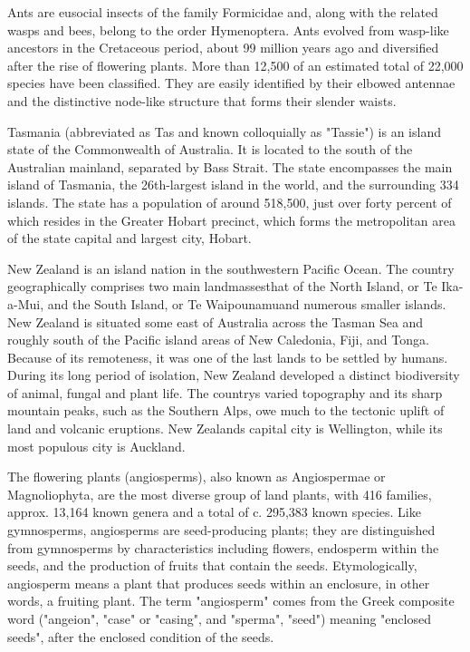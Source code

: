 \documentclass{article} \usepackage{iclr2019_conference,times}
\begin{document}
Ants are eusocial insects of the family Formicidae and, along with the related wasps and bees, belong to the order Hymenoptera. Ants evolved from wasp-like ancestors in the Cretaceous period, about 99 million years ago and diversified after the rise of flowering plants. More than 12,500 of an estimated total of 22,000 species have been classified. They are easily identified by their elbowed antennae and the distinctive node-like structure that forms their slender waists.

Tasmania (abbreviated as Tas and known colloquially as "Tassie") is an island state of the Commonwealth of Australia. It is located to the south of the Australian mainland, separated by Bass Strait. The state encompasses the main island of Tasmania, the 26th-largest island in the world, and the surrounding 334 islands. The state has a population of around 518,500, just over forty percent of which resides in the Greater Hobart precinct, which forms the metropolitan area of the state capital and largest city, Hobart.

New Zealand is an island nation in the southwestern Pacific Ocean. The country geographically comprises two main landmassesthat of the North Island, or Te Ika-a-Mui, and the South Island, or Te Waipounamuand numerous smaller islands. New Zealand is situated some east of Australia across the Tasman Sea and roughly south of the Pacific island areas of New Caledonia, Fiji, and Tonga. Because of its remoteness, it was one of the last lands to be settled by humans. During its long period of isolation, New Zealand developed a distinct biodiversity of animal, fungal and plant life. The countrys varied topography and its sharp mountain peaks, such as the Southern Alps, owe much to the tectonic uplift of land and volcanic eruptions. New Zealands capital city is Wellington, while its most populous city is Auckland.

The flowering plants (angiosperms), also known as Angiospermae or Magnoliophyta, are the most diverse group of land plants, with 416 families, approx. 13,164 known genera and a total of c. 295,383 known species. Like gymnosperms, angiosperms are seed-producing plants; they are distinguished from gymnosperms by characteristics including flowers, endosperm within the seeds, and the production of fruits that contain the seeds. Etymologically, angiosperm means a plant that produces seeds within an enclosure, in other words, a fruiting plant. The term "angiosperm" comes from the Greek composite word ("angeion", "case" or "casing", and "sperma", "seed") meaning "enclosed seeds", after the enclosed condition of the seeds.
\end{document}
